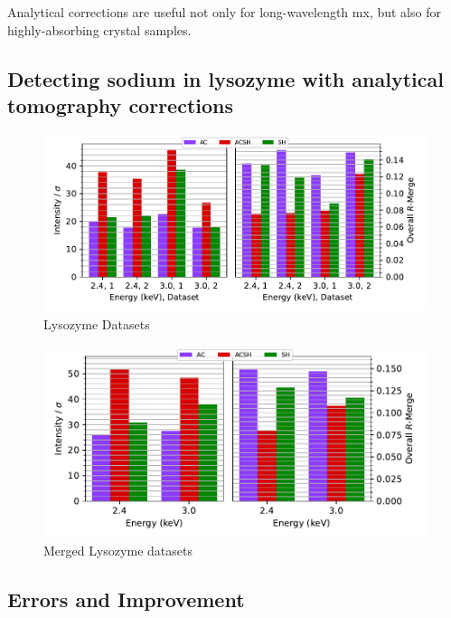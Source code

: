 Analytical corrections are useful not only for long-wavelength \ac{mx}, but also for highly-absorbing crystal samples.



\subsection{Detecting sodium in lysozyme with analytical tomography corrections}

\begin{figure}
    \centering
    \includegraphics{plots/exp3/lys_stats_grid.pdf}
    \caption{Lysozyme Datasets}
    \label{fig:enter-label}
\end{figure}

\begin{figure}
    \centering
    \includegraphics{plots/exp3/merged_stats_grid.pdf}
    \caption{Merged Lysozyme datasets}
    \label{fig:enter-label}
\end{figure}

\subsection{Errors and Improvement}

